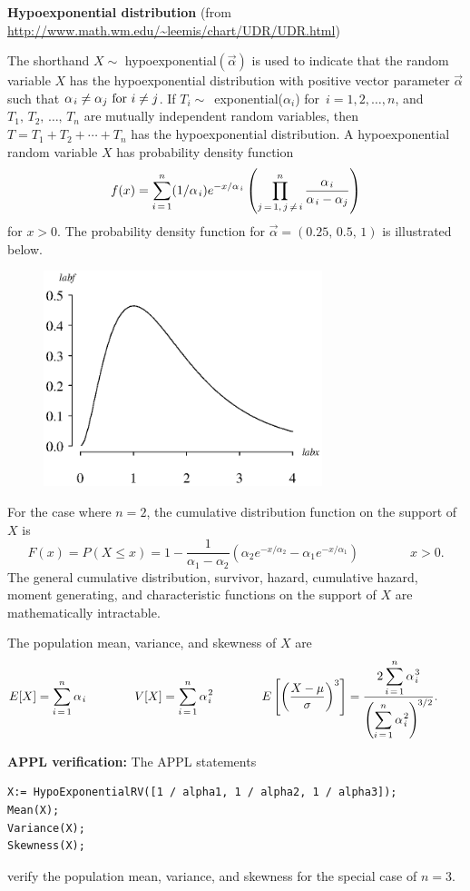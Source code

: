 \documentclass[12pt,fullpage]{article}
\begin{document}
\noindent
{\bf Hypoexponential distribution} (from \color{blue}\url{http://www.math.wm.edu/~leemis/chart/UDR/UDR.html}\color{black})

\noindent
The shorthand $X \sim$ hypoexponential$(\vec{\alpha})$ is used to indicate that the
random variable $X$ has the hypoexponential distribution with positive vector
parameter $\vec \alpha$ such that $\alpha_{\kern 0.08 em i}\neq \alpha_j\  {\rm for}\  i \neq j$.  
If $T_i\sim$~exponential($\alpha_i$) for~$i=1,2,\ldots,n$, and $T_1, \, T_2, \, \ldots , \, T_n$ are
mutually independent random variables, then $T=T_1+T_2+\cdots+T_n$ has the hypoexponential distribution.
A hypoexponential random variable $X$ has probability density function 
$$
f(x) = \sum_{i\,=\,1}^n(1/\alpha_{\kern 0.08 em i})e^{-x/\alpha_{\kern 0.08 em i}}\left(\prod_{j\,=\,1,\,j \, \neq \,  i}^n \frac{\alpha_{\kern 0.08 em i}}{\alpha_{\kern 0.08 em i}-\alpha_j}\right)
$$
for $x>0$. The probability density function for $\vec \alpha = (0.25, \, 0.5, \, 1)$ is illustrated below.

\begin{figure}[h!]
\begin{center}
\includegraphics[width=3.2in]{HypoexponentialPlot.ps}
\end{center}
\end{figure}

\noindent
For the case where $n=2$, the cumulative distribution function on the support of $X$ is
$$
F(x) = P(X \leq x) = 1 - \frac{1}{\alpha_1 - \alpha_2} \left( \alpha_2 e^{-x/\alpha_2} - \alpha_1 e^{-x/\alpha_1} \right)
\qquad \qquad x > 0.
$$
The general cumulative distribution, survivor, hazard, cumulative hazard, moment generating, and characteristic functions on the support of $X$ are mathematically intractable.
\vspace{0.1in}

\noindent
The population mean, variance, and skewness of $X$ are
$$
E[X] = \displaystyle \sum_{i\,=\,1}^n \alpha_{\kern 0.08 em i} \qquad \qquad 
V[X] =  \displaystyle \sum_{i\,=\,1}^n \alpha_{\kern 0.08 emi}^{\kern 0.08 em 2}  \qquad \qquad 
E\left[ \left( \frac{X - \mu}{\sigma} \right) ^ 3 \right] = \frac{2 \displaystyle \sum_{i\,=\,1}^n \alpha_{\kern 0.08 em i}^{\kern 0.08 em 3}}{\left( \displaystyle \sum_{i\,=\,1}^n \alpha_{\kern 0.08 em i}^{\kern 0.08 em 2}\right)^{\kern -0.08 em 3/2}}. \quad \quad
$$
\vspace{0.1in}

\newpage
\noindent
{\bf APPL verification:}
The APPL statements
\begin{verbatim}
X:= HypoExponentialRV([1 / alpha1, 1 / alpha2, 1 / alpha3]);
Mean(X);
Variance(X);
Skewness(X);
\end{verbatim}
verify the population mean, variance, and skewness for the special case of $n=3$.
\end{document}
